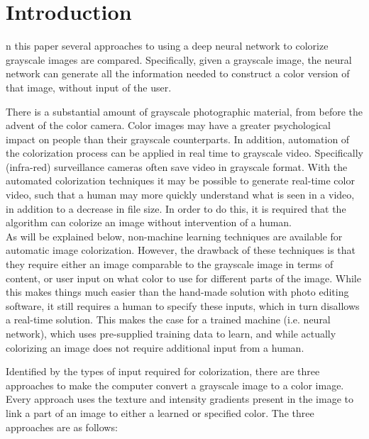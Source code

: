 \section{Introduction}\label{sec:intro}

%
%
%


n this paper several approaches to using a deep neural network to colorize grayscale images are compared. Specifically, given a grayscale image, the neural network can generate all the information needed to construct a color version of that image, without input of the user. 

There is a substantial amount of grayscale photographic material, from before the advent of the color camera. Color images may have a greater psychological impact on people than their grayscale counterparts.
In addition, automation of the colorization process can be applied in real time to grayscale video. Specifically (infra-red) surveillance cameras often save video in grayscale format. With the automated colorization techniques it may be possible to generate real-time color video, such that a human may more quickly understand what is seen in a video, in addition to a decrease in file size. In order to do this, it is required that the algorithm can colorize an image without intervention of a human.\\

As will be explained below, non-machine learning techniques are available for automatic image colorization. However, the drawback of these techniques is that they require either an image comparable to the grayscale image in terms of content, or user input on what color to use for different parts of the image. 
While this makes things much easier than the hand-made solution with photo editing software, it still requires a human to specify these inputs, which in turn disallows a real-time solution. This makes the case for a trained machine (i.e. neural network), which uses pre-supplied training data to learn, and while actually colorizing an image does not require additional input from a human.

Identified by the types of input required for colorization, there are three approaches to make the computer convert a grayscale image to a color image. Every approach uses the texture and intensity gradients present in the image to link a part of an image to either a learned or specified color. The three approaches are as follows:

